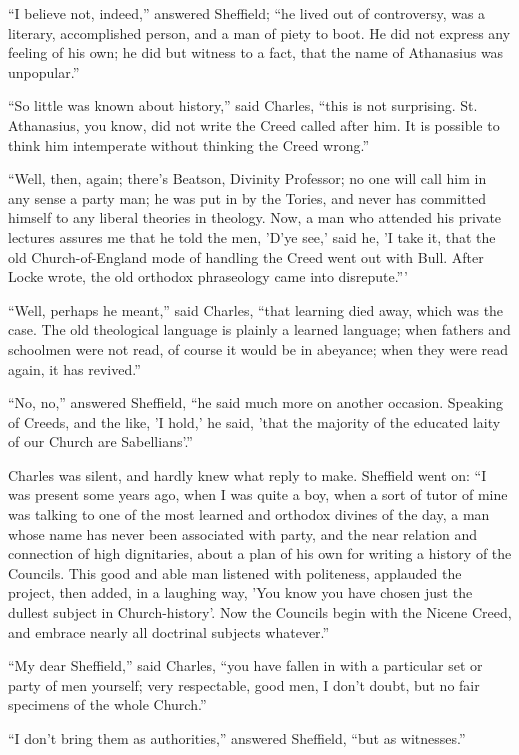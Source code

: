 ``I believe not, indeed,'' answered Sheffield; ``he
lived out of controversy, was a literary, accomplished person, and a
man of piety to boot. He did not express any feeling of his own; he
did but witness to a fact, that the name of Athanasius was
unpopular.''

``So little was known about history,'' said Charles,
``this is not surprising. St. Athanasius, you know, did not write
the Creed called after him. It is possible to think him intemperate
without thinking the Creed wrong.''

``Well, then, again; there's Beatson, Divinity Professor; no
one will call him in any sense a party man; he was put in by the
Tories, and never has committed himself to any liberal theories in
theology. Now, a man who attended his private lectures assures me that
he told the men, 'D'ye see,' said he, 'I take it, that the old
Church-of-England mode of handling the Creed went out with Bull. After
Locke wrote, the old orthodox phraseology came into disrepute.'''

``Well, perhaps he meant,'' said Charles, ``that
learning died away, which was the case. The old theological language
is plainly a learned language; when fathers and schoolmen were not
read, of course it would be in abeyance; when they were read again, it
has revived.''

``No, no,'' answered Sheffield, ``he said much more on
another occasion. Speaking of Creeds, and the like, 'I hold,' he said,
'that the majority of the educated laity of our Church are Sabellians'.''

Charles was silent, and hardly knew what reply to make. Sheffield
went on: ``I was present some years ago, when I was quite a boy,
when a sort of tutor of mine was talking to one of the most learned
and orthodox divines of the day, a man whose name has never been
associated with party, and the near relation and connection of high
dignitaries, about a plan of his own for writing a history of the
Councils. This good and able man listened with politeness, applauded
the project, then added, in a laughing way, 'You know you have chosen
just the dullest subject in Church-history'. Now the Councils begin
with the Nicene Creed, and embrace nearly all doctrinal subjects
whatever.''

``My dear Sheffield,'' said Charles, ``you have fallen
in with a particular set or party of men yourself; very respectable,
good men, I don't doubt, but no fair specimens of the whole
Church.''

``I don't bring them as authorities,'' answered Sheffield,
``but as witnesses.''

